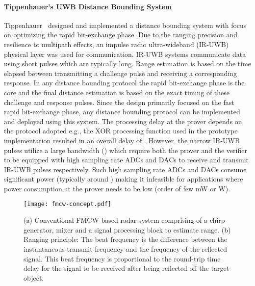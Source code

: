 \documentclass{sig-alternate-10pt}
\begin{document}
\paragraph{Tippenhauer's UWB Distance Bounding System}
Tippenhauer~\cite{Tippenhauer12} designed and implemented a distance bounding
system with focus on optimizing the rapid bit-exchange phase. Due to the ranging
precision and resilience to multipath effects, an impulse radio ultra-wideband
(IR-UWB) physical layer was used for communication. IR-UWB systems communicate
data using short pulses which are typically  long. Range
estimation is based on the time elapsed between transmitting a challenge pulse
and receiving a corresponding response. In any distance bounding protocol the
rapid bit-exchange phase is the core and the final distance estimation is based
on the exact timing of these challenge and response pulses. Since the design
primarily focused on the fast rapid bit-exchange phase, any distance bounding
protocol can be implemented and deployed using this system. The processing delay
at the prover depends on the protocol adopted e.g., the XOR processing function
used in the prototype implementation resulted in an overall delay of . However, the narrow IR-UWB pulses utilize a large bandwidth
() which require both the prover and the verifier to be equipped
with high sampling rate ADCs and DACs to receive and transmit IR-UWB pulses
respectively. Such high sampling rate ADCs and DACs consume significant power
(typically around ) making it infeasible for applications where power
consumption at the prover needs to be low (order of few mW or
W).

\begin{figure*}[t]
  \centering
  \texttt{[image: fmcw-concept.pdf]}
  \caption{(a) Conventional FMCW-based radar system comprising of a chirp
    generator, mixer and a signal processing block to estimate range. (b)
    Ranging principle: The beat frequency  is the difference
    between the instantaneous transmit frequency and the frequency of the
    reflected signal. This beat frequency is proportional to the round-trip
    time delay  for the signal to be received after being reflected off
    the target object.}
  \label{fig:fmcw-concept}
\end{figure*}
\end{document}
